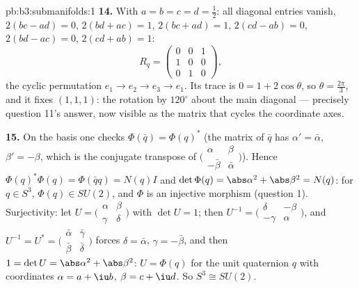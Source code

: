 \begin{solution}{pb:b3:submanifolds:1}
\textbf{14.} With $a = b = c = d = \frac12$: all diagonal
entries vanish, $2(bc - ad) = 0$, $2(bd + ac) = 1$, $2(bc +
ad) = 1$, $2(cd - ab) = 0$, $2(bd - ac) = 0$, $2(cd + ab) =
1$:
\[
R_q = \begin{pmatrix} 0 & 0 & 1\\ 1 & 0 & 0\\ 0 & 1 & 0
\end{pmatrix},
\]
the cyclic permutation $e_1 \to e_2 \to e_3 \to e_1$. Its
trace is $0 = 1 + 2\cos\theta$, so $\theta = \frac{2\pi}3$,
and it fixes $(1,1,1)$: the rotation by $120^\circ$ about
the main diagonal --- precisely question 11's answer, now
visible as the matrix that cycles the coordinate axes.

\textbf{15.} On the basis one checks $\Phi(\bar q) =
\Phi(q)^*$ (the matrix of $\bar q$ has $\alpha' =
\bar\alpha$, $\beta' = -\beta$, which is the conjugate
transpose of $\bigl(\begin{smallmatrix}\alpha & \beta\\
-\bar\beta & \bar\alpha\end{smallmatrix}\bigr)$). Hence
$\Phi(q)^*\Phi(q) = \Phi(\bar qq) = N(q)I$ and $\det\Phi(q)
= \abs\alpha^2 + \abs\beta^2 = N(q)$: for $q \in S^3$,
$\Phi(q) \in SU(2)$, and $\Phi$ is an injective morphism
(question 1). Surjectivity: let $U =
\bigl(\begin{smallmatrix}\alpha & \beta\\ \gamma &
\delta\end{smallmatrix}\bigr)$ with $\det U = 1$; then
$U^{-1} = \bigl(\begin{smallmatrix}\delta & -\beta\\
-\gamma & \alpha\end{smallmatrix}\bigr)$, and $U^{-1} = U^*
= \bigl(\begin{smallmatrix}\bar\alpha & \bar\gamma\\
\bar\beta & \bar\delta\end{smallmatrix}\bigr)$ forces
$\delta = \bar\alpha$, $\gamma = -\bar\beta$, and then $1 =
\det U = \abs\alpha^2 + \abs\beta^2$: $U = \Phi(q)$ for the
unit quaternion $q$ with coordinates $\alpha = a + \iu b$,
$\beta = c + \iu d$. So $S^3 \cong SU(2)$.


\end{solution}

